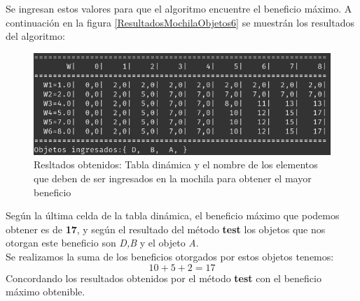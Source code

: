             Se ingresan estos valores para que el algoritmo encuentre el beneficio máximo. A continuación en la figura \ref{ResultadosMochilaObjetos6} se muestrán los resultados del algoritmo:
            \begin{figure}[h!]
                \centering
                \includegraphics[width=\textwidth]{Knapsack/MochilaObjetos6.png}
                \caption{Resltados obtenidos: Tabla dinámica y el nombre de los elementos que deben de ser ingresados en la mochila para obtener el mayor beneficio}
                \label{ResultadosMochilaObjetos5}
            \end{figure}
            
            Según la última celda de la tabla dinámica, el beneficio máximo que podemos obtener es de \textbf{17}, y según el resultado del método \textbf{test} los objetos que nos otorgan este beneficio son \textit{D,B} y el objeto \textit{A}.\\
            
            Se realizamos la suma de los beneficios otorgados por estos objetos tenemos:
            $$ 10+5+2 = 17$$
            Concordando los resultados obtenidos por el método \textbf{test} con el beneficio máximo obtenible.
        
            
